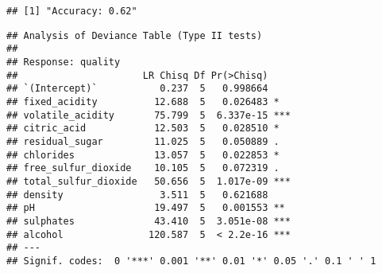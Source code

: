 \documentclass{article}
\begin{document}
\begin{verbatim}
## [1] "Accuracy: 0.62"
\end{verbatim}

\begin{Shaded}
\begin{Highlighting}[]
\OtherTok{=}  \NormalTok{)}
\end{Highlighting}
\end{Shaded}

\begin{verbatim}
## Analysis of Deviance Table (Type II tests)
## 
## Response: quality
##                      LR Chisq Df Pr(>Chisq)    
## `(Intercept)`           0.237  5   0.998664    
## fixed_acidity          12.688  5   0.026483 *  
## volatile_acidity       75.799  5  6.337e-15 ***
## citric_acid            12.503  5   0.028510 *  
## residual_sugar         11.025  5   0.050889 .  
## chlorides              13.057  5   0.022853 *  
## free_sulfur_dioxide    10.105  5   0.072319 .  
## total_sulfur_dioxide   50.656  5  1.017e-09 ***
## density                 3.511  5   0.621688    
## pH                     19.497  5   0.001553 ** 
## sulphates              43.410  5  3.051e-08 ***
## alcohol               120.587  5  < 2.2e-16 ***
## ---
## Signif. codes:  0 '***' 0.001 '**' 0.01 '*' 0.05 '.' 0.1 ' ' 1
\end{verbatim}

\begin{Shaded}
\begin{Highlighting}[]
\end{Highlighting}
\end{Shaded}
\end{document}
